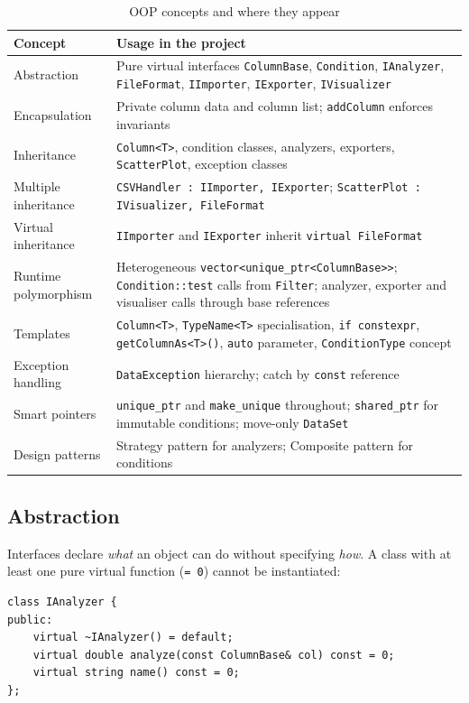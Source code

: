 \documentclass[11pt,a4paper]{article}
\newcommand{\code}[1]{\texttt{#1}}
\begin{document}
\begin{table}[H]
\centering
\caption{OOP concepts and where they appear}
\label{tab:oop}
\begin{tabularx}{\textwidth}{@{}l L@{}}
\toprule
\textbf{Concept} & \textbf{Usage in the project} \\
\midrule
Abstraction & Pure virtual interfaces \code{ColumnBase}, \code{Condition}, \code{IAnalyzer}, \code{FileFormat}, \code{IImporter}, \code{IExporter}, \code{IVisualizer} \\
Encapsulation & Private column data and column list; \code{addColumn} enforces invariants \\
Inheritance & \code{Column<T>}, condition classes, analyzers, exporters, \code{ScatterPlot}, exception classes \\
Multiple inheritance & \code{CSVHandler : IImporter, IExporter}; \code{ScatterPlot : IVisualizer, FileFormat} \\
Virtual inheritance & \code{IImporter} and \code{IExporter} inherit \code{virtual FileFormat} \\
Runtime polymorphism & Heterogeneous \code{vector<unique\_ptr<ColumnBase>>}; \code{Condition::test} calls from \code{Filter}; analyzer, exporter and visualiser calls through base references \\
Templates & \code{Column<T>}, \code{TypeName<T>} specialisation, \code{if constexpr}, \code{getColumnAs<T>()}, \code{auto} parameter, \code{ConditionType} concept \\
Exception handling & \code{DataException} hierarchy; catch by \code{const} reference \\
Smart pointers & \code{unique\_ptr} and \code{make\_unique} throughout; \code{shared\_ptr} for immutable conditions; move-only \code{DataSet} \\
Design patterns & Strategy pattern for analyzers; Composite pattern for conditions \\
\bottomrule
\end{tabularx}
\end{table}

\subsection{Abstraction}

Interfaces declare \emph{what} an object can do without specifying \emph{how}. A class with at
least one pure virtual function (\code{= 0}) cannot be instantiated:

\begin{lstlisting}
class IAnalyzer {
public:
    virtual ~IAnalyzer() = default;
    virtual double analyze(const ColumnBase& col) const = 0;
    virtual string name() const = 0;
};
\end{lstlisting}
\end{document}
